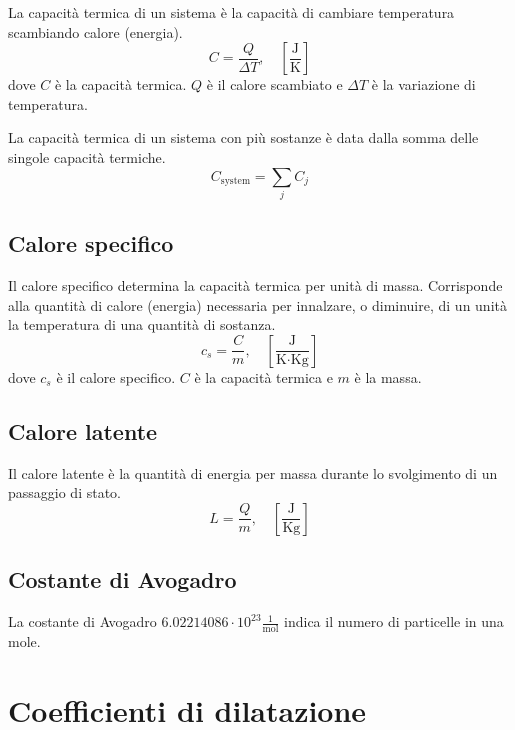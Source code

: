 \documentclass{article}
\begin{document}
La capacità termica di un sistema è la capacità di
cambiare temperatura scambiando calore (energia).
\[
    C=\frac{Q}{\Delta T}, \quad \left[\frac{\text{J}}{\text{K}}\right]
\]
dove \(C\) è la capacità termica.
\(Q\) è il calore scambiato e \(\Delta T\) è la variazione di temperatura.

La capacità termica di un sistema con più sostanze è data dalla somma
delle singole capacità termiche.
\[
    C_{\text{system}} = \sum_j C_j
\]

\subsection{Calore specifico}

Il calore specifico determina la capacità termica per unità di massa.
Corrisponde alla quantità di calore (energia) necessaria per innalzare,
o diminuire, di un unità la temperatura di una quantità di sostanza.
\[
    c_s = \frac{C}{m}, \quad \left[\frac{\text{J}}{\text{K}\cdot \text{Kg}}\right]
\]
dove \(c_s\) è il calore specifico. \(C\) è la capacità termica
e \(m\) è la massa.

\subsection{Calore latente}

Il calore latente è la quantità di energia per massa
durante lo svolgimento di un passaggio di stato.
\[
    L=\frac{Q}{m}, \quad \left[\frac{\text{J}}{\text{Kg}}\right]
\]


\pagebreak

\subsection{Costante di Avogadro}

La costante di Avogadro \(6.02214086 \cdot 10^{23} \frac{1}{\text{mol}}\)
indica il numero di particelle in una mole.

\section{Coefficienti di dilatazione}
\end{document}
